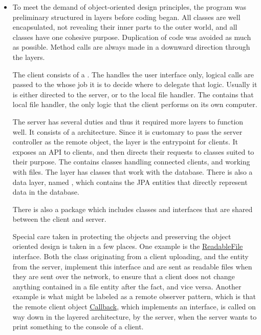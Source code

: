 \documentclass[a4paper]{scrartcl}
\begin{document}
\begin{itemize}
    \item To meet the demand of object-oriented design principles, the program was preliminary structured in layers before coding began. All classes are well encapsulated, not revealing their inner parts to the outer world, and all classes have one cohesive purpose. Duplication of code was avoided as much as possible. Method calls are always made in a downward direction through the layers.

        The client consists of a . The  handles the user interface only, logical calls are passed to the  whose job it is to decide where to delegate that logic. Usually it is either directed to the server, or to the local file handler. The  contains that local file handler, the only logic that the client performs on its own computer.

        The server has several duties and thus it required more layers to function well. It consists of a  architecture. Since it is customary to pass the server controller as the remote object, the  layer is the entrypoint for clients. It exposes an API to clients, and then directs their requests to classes suited to their purpose. The  contains classes handling connected clients, and working with files. The  layer has classes that work with the database. There is also a data layer, named , which contains the JPA entities that directly represent data in the database.

        There is also a  package which includes classes and interfaces that are shared between the client and server.

        Special care taken in protecting the objects and preserving the object oriented design is taken in a few places. One example is the \href{https://github.com/fongie/Filehandler/blob/master/common/common/ReadableFile.java}{ReadableFile} interface. Both the  class originating from a client uploading, and the  entity from the server, implement this interface and are sent as readable files when they are sent over the network, to ensure that a client does not change anything contained in a file entity after the fact, and vice versa. Another example is what might be labeled as a remote observer pattern, which is that the remote client object \href{https://github.com/fongie/Filehandler/blob/143ac2e6c4f62b801610bd51a0752c945b97d358/filehandler_client/src/main/java/view/UserInterface.java#L250}{Callback}, which implements an interface, is called on way down in the layered architecture, by the server, when the server wants to print something to the console of a client.
        

\end{itemize}
\end{document}
